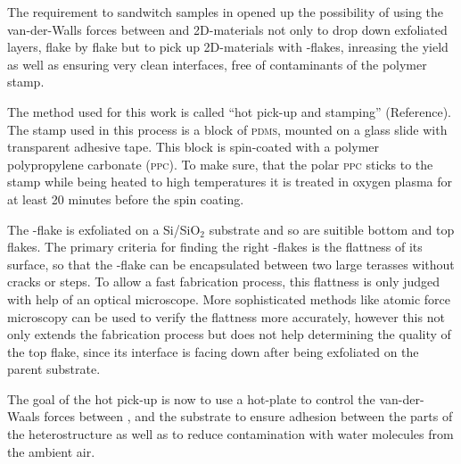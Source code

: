 The requirement to sandwitch samples in \hbn opened up the possibility of using the van-der-Walls forces between \hbn and 2D-materials not only to drop down exfoliated layers, flake by flake but to pick up 2D-materials with \hbn-flakes, inreasing the yield as well as ensuring very clean interfaces, free of contaminants of the polymer stamp. 

The method used for this work is called ``hot pick-up and stamping'' (Reference). The stamp used in this process is a block of \textsc{pdms}, mounted on a glass slide with transparent adhesive tape. This block is spin-coated with a polymer polypropylene carbonate (\textsc{ppc}). To make sure, that the polar \textsc{ppc} sticks to the stamp while being heated to high temperatures it is treated in oxygen plasma for at least 20 minutes before the spin coating.

The \tmd-flake is exfoliated on a Si/SiO$_2$ substrate and so are suitible bottom and top \hbn flakes. The primary criteria for finding the right \hbn-flakes is the flattness of its surface, so that the \tmd-flake can be encapsulated between two large terasses without cracks or steps. To allow a fast fabrication process, this flattness is only judged with help of an optical microscope. More sophisticated methods like atomic force microscopy can be used to verify the flattness more accurately, however this not only extends the fabrication process but does not help determining the quality of the top \hbn flake, since its interface is facing down after being exfoliated on the parent substrate.

The goal of the hot pick-up is now to use a hot-plate to control the van-der-Waals forces between \hbn, \tmds and the substrate to ensure adhesion between the parts of the heterostructure as well as to reduce contamination with water molecules from the ambient air.

